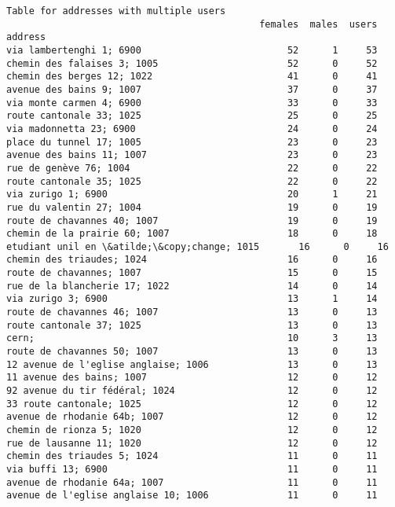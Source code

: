 \documentclass{report}
\begin{document}
    \begin{Verbatim}[commandchars=\\\{\}]
Table for addresses with multiple users
                                             females  males  users
address                                                           
via lambertenghi 1; 6900                          52      1     53
chemin des falaises 3; 1005                       52      0     52
chemin des berges 12; 1022                        41      0     41
avenue des bains 9; 1007                          37      0     37
via monte carmen 4; 6900                          33      0     33
route cantonale 33; 1025                          25      0     25
via madonnetta 23; 6900                           24      0     24
place du tunnel 17; 1005                          23      0     23
avenue des bains 11; 1007                         23      0     23
rue de genève 76; 1004                            22      0     22
route cantonale 35; 1025                          22      0     22
via zurigo 1; 6900                                20      1     21
rue du valentin 27; 1004                          19      0     19
route de chavannes 40; 1007                       19      0     19
chemin de la prairie 60; 1007                     18      0     18
etudiant unil en \&atilde;\&copy;change; 1015       16      0     16
chemin des triaudes; 1024                         16      0     16
route de chavannes; 1007                          15      0     15
rue de la blancherie 17; 1022                     14      0     14
via zurigo 3; 6900                                13      1     14
route de chavannes 46; 1007                       13      0     13
route cantonale 37; 1025                          13      0     13
cern;                                             10      3     13
route de chavannes 50; 1007                       13      0     13
12 avenue de l'eglise anglaise; 1006              13      0     13
11 avenue des bains; 1007                         12      0     12
92 avenue du tir fédéral; 1024                    12      0     12
33 route cantonale; 1025                          12      0     12
avenue de rhodanie 64b; 1007                      12      0     12
chemin de rionza 5; 1020                          12      0     12
rue de lausanne 11; 1020                          12      0     12
chemin des triaudes 5; 1024                       11      0     11
via buffi 13; 6900                                11      0     11
avenue de rhodanie 64a; 1007                      11      0     11
avenue de l'eglise anglaise 10; 1006              11      0     11

\end{Verbatim}
\end{document}
